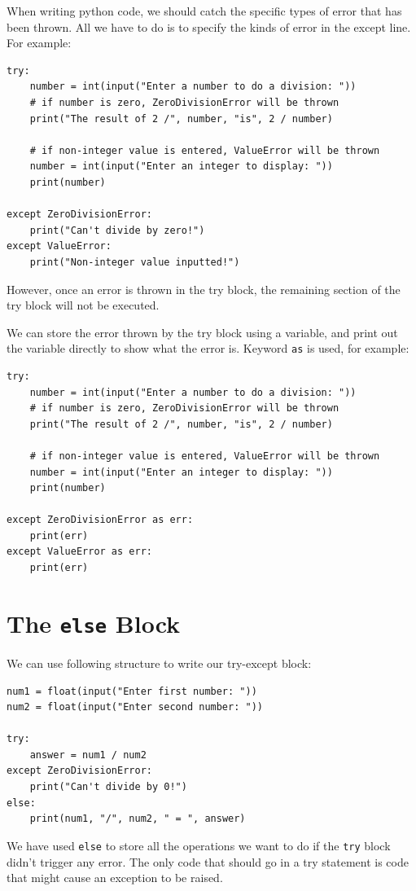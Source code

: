\documentclass[12pt]{book}
\begin{document}
When writing python code, we should catch the specific types of error that has been thrown. All we have to do is to specify the kinds of error in the except line. For example:
\begin{verbatim}
try:
    number = int(input("Enter a number to do a division: "))
    # if number is zero, ZeroDivisionError will be thrown
    print("The result of 2 /", number, "is", 2 / number)

    # if non-integer value is entered, ValueError will be thrown
    number = int(input("Enter an integer to display: "))
    print(number)

except ZeroDivisionError:
    print("Can't divide by zero!")
except ValueError:
    print("Non-integer value inputted!")
\end{verbatim}
However, once an error is thrown in the try block, the remaining section of the try block will not be executed.

We can store the error thrown by the try block using a variable, and print out the variable directly to show what the error is. Keyword \texttt{as} is used, for example:
\begin{verbatim}
try:
    number = int(input("Enter a number to do a division: "))
    # if number is zero, ZeroDivisionError will be thrown
    print("The result of 2 /", number, "is", 2 / number)

    # if non-integer value is entered, ValueError will be thrown
    number = int(input("Enter an integer to display: "))
    print(number)

except ZeroDivisionError as err:
    print(err)
except ValueError as err:
    print(err)
\end{verbatim}
\section{The \texttt{else} Block}
\label{sec:orgbf74132}
We can use following structure to write our try-except block:
\begin{verbatim}
num1 = float(input("Enter first number: "))
num2 = float(input("Enter second number: "))

try:
    answer = num1 / num2
except ZeroDivisionError:
    print("Can't divide by 0!")
else:
    print(num1, "/", num2, " = ", answer)
\end{verbatim}
We have used \texttt{else} to store all the operations we want to do if the \texttt{try} block didn't trigger any error. The only code that should go in a try statement is code that might cause an exception to be raised.
\end{document}
